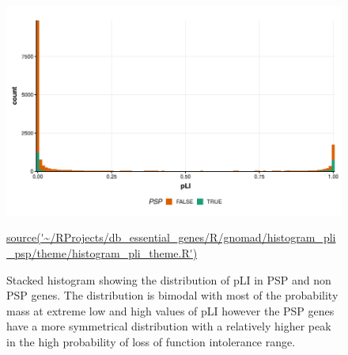 \begin{figure}
    \centering
    \includegraphics[width=\textwidth]{images/chapter3/ggplot2/gnomad/theme/Rplot_histogram_pLI_theme.png}
    \caption[Histogram of pLI comparing PSP and non PSP genes]{Stacked histogram showing the distribution of pLI in PSP and non PSP genes. The distribution is bimodal with most of the probability mass at extreme low and high values of pLI however the PSP genes have a more symmetrical distribution with a relatively higher peak in the high probability of loss of function intolerance range.}
    \tiny\url{source('~/RProjects/db_essential_genes/R/gnomad/histogram_pli_psp/theme/histogram_pli_theme.R')}
    
    \label{fig:hist_pliPSP_theme}
\end{figure}



